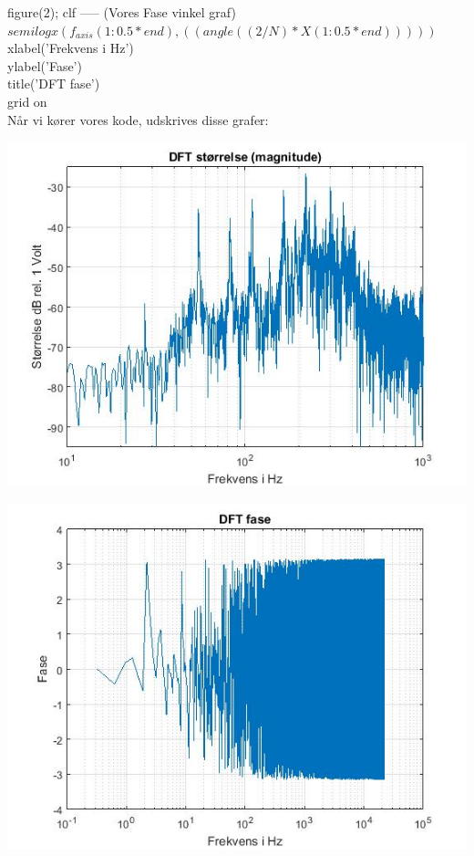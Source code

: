 \documentclass[12pt, letterpaper]{article}
\begin{document}
figure(2); clf 		-----  (Vores Fase vinkel graf)   \\                     
$semilogx(f_{axis}(1:0.5*end), ((angle((2/N)*X(1:0.5*end)))))$\\
xlabel('Frekvens i Hz')\\
ylabel('Fase')\\
title('DFT fase')\\
grid on \\

Når vi kører vores kode, udskrives disse grafer: 

\begin{center}
\includegraphics[width=\textwidth]{billeder/storrelsebilmotor}
\end{center}

\begin{center}
\includegraphics[width=\textwidth]{billeder/fasebilmotor}
\end{center}
\end{document}
